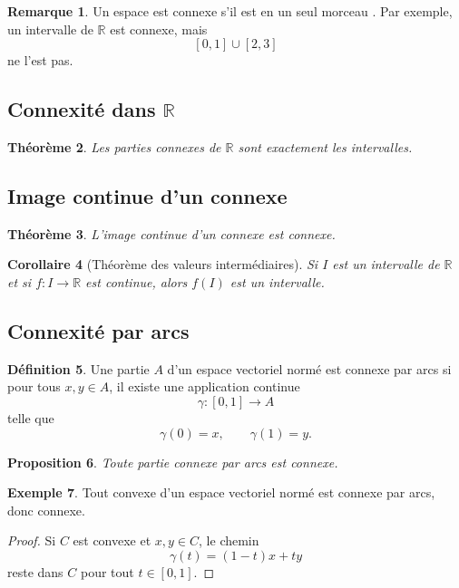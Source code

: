 \documentclass[11pt,a4paper]{article}
\theoremstyle{definition}
\newtheorem{definition}{Définition}[section]
\newtheorem{exemple}[definition]{Exemple}
\newtheorem{remarque}[definition]{Remarque}
\theoremstyle{plain}
\newtheorem{proposition}[definition]{Proposition}
\newtheorem{theoreme}[definition]{Théorème}
\newtheorem{corollaire}[definition]{Corollaire}
\newcommand{\R}{\mathbb{R}}
\begin{document}
\begin{remarque}
Un espace est connexe s'il est \og en un seul morceau \fg.
Par exemple, un intervalle de $\R$ est connexe, mais
\[
[0,1]\cup [2,3]
\]
ne l'est pas.
\end{remarque}

\subsection{Connexité dans $\R$}

\begin{theoreme}
Les parties connexes de $\R$ sont exactement les intervalles.
\end{theoreme}

\subsection{Image continue d'un connexe}

\begin{theoreme}
L'image continue d'un connexe est connexe.
\end{theoreme}

\begin{corollaire}[Théorème des valeurs intermédiaires]
Si $I$ est un intervalle de $\R$ et si $f:I\to\R$ est continue, alors $f(I)$ est un intervalle.
\end{corollaire}

\subsection{Connexité par arcs}

\begin{definition}
Une partie $A$ d'un espace vectoriel normé est connexe par arcs si pour tous $x,y\in A$, il existe une application continue
\[
\gamma:[0,1]\to A
\]
telle que
\[
\gamma(0)=x,
\qquad
\gamma(1)=y.
\]
\end{definition}

\begin{proposition}
Toute partie connexe par arcs est connexe.
\end{proposition}

\begin{exemple}
Tout convexe d'un espace vectoriel normé est connexe par arcs, donc connexe.
\end{exemple}

\begin{proof}
Si $C$ est convexe et $x,y\in C$, le chemin
\[
\gamma(t)=(1-t)x+ty
\]
reste dans $C$ pour tout $t\in[0,1]$.
\end{proof}
\end{document}
